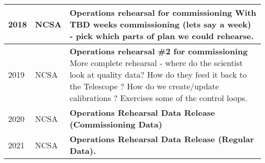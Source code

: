 \begin{longtable} {|l|l|p{}|}
2018 &  NCSA & {\bf Operations rehearsal for commissioning }
With TBD weeks commissioning (lets say a week) - pick which parts of plan we could rehearse.
\\ \hline

2019 & NCSA &  {\bf  Operations rehearsal \#2 for commissioning} 
More complete rehearsal - where do the scientist look at quality data? How do they feed it back to the Telescope ?
How do we create/update calibrations ? Exercises some of the control loops.
\\ \hline
\hline
2020 &  NCSA &  {\bf Operations  Rehearsal Data Release (Commissioning Data)}
\\ \hline
2021 &  NCSA &  {\bf Operations  Rehearsal Data Release (Regular Data).}
\\ \hline

\hline

\end{longtable}
